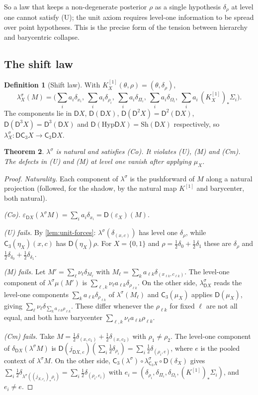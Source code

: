 \documentclass[11pt]{article}
\newtheorem{theorem}{Theorem}[section]
\theoremstyle{definition}
\newtheorem{definition}[theorem]{Definition}
\theoremstyle{remark}
\newcommand{\D}{\mathsf{D}}
\newcommand{\Hyp}{\mathrm{Hyp}}
\newcommand{\Sh}{\mathrm{Sh}}
\newcommand{\C}{\mathsf{C}}
\newcommand{\ls}{\lambda^{\sigma}}
\begin{document}
So a law that keeps a non-degenerate posterior $\rho$ as a single hypothesis $\delta_\rho$ at level one
cannot satisfy (U); the unit axiom requires level-one information to be spread over point
hypotheses. This is the precise form of the tension between hierarchy and barycentric collapse.

\subsection{The shift law}

\begin{definition}[Shift law]
With $K^{[1]}_X(\theta,\rho)=(\theta,\delta_\rho)$,
\[
\ls_X(M)=\Big(\sum_ia_i\delta_{x_i},\ \sum_ia_i\delta_{\rho_i},\ \sum_ia_i\delta_{\Pi_i},\
\sum_ia_i\delta_{\Omega_i},\ \sum_ia_i\,(K^{[1]}_X)_*\Sigma_i\Big).
\]
The components lie in $\D X$, $\D(\D X)$, $\D(\D^2X)=\D^2(\D X)$, $\D(\D^3X)=\D^3(\D X)$ and
$\D(\Hyp\D X)=\Sh(\D X)$ respectively, so $\ls_X\colon\D\C_3X\to\C_3\D X$.
\end{definition}

\begin{theorem}\label{thm:shift}
$\ls$ is natural and satisfies (Co). It violates (U), (M) and (Cm). The defects in (U) and (M) at
level one vanish after applying $\mu_X$.
\end{theorem}
\begin{proof}
\emph{Naturality.} Each component of $\ls$ is the pushforward of $M$ along a natural projection
(followed, for the shadow, by the natural map $K^{[1]}$ and barycenter, both natural).

\emph{(Co).} $\varepsilon_{\D X}(\ls M)=\sum_ia_i\delta_{x_i}=\D(\varepsilon_X)(M)$.

\emph{(U) fails.} By \cref{lem:unit-forces}: $\ls(\delta_{(x,c)})$ has level one $\delta_\rho$, while
$\C_3(\eta_X)(x,c)$ has $\D(\eta_X)\rho$. For $X=\{0,1\}$ and $\rho=\tfrac12\delta_0+\tfrac12\delta_1$
these are $\delta_\rho$ and $\tfrac12\delta_{\delta_0}+\tfrac12\delta_{\delta_1}$.

\emph{(M) fails.} Let $M'=\sum_\ell\nu_\ell\delta_{M_\ell}$ with $M_\ell=\sum_k a_{\ell k}
\delta_{(x_{\ell k},c_{\ell k})}$. The level-one component of $\ls\mu(M')$ is
$\sum_{\ell,k}\nu_\ell a_{\ell k}\delta_{\rho_{\ell k}}$. On the other side, $\ls_{\D X}$ reads the
level-one components $\sum_ka_{\ell k}\delta_{\rho_{\ell k}}$ of $\ls(M_\ell)$ and $\C_3(\mu_X)$ applies
$\D(\mu_X)$, giving $\sum_\ell\nu_\ell\delta_{\sum_ka_{\ell k}\rho_{\ell k}}$. These differ whenever the
$\rho_{\ell k}$ for fixed $\ell$ are not all equal, and both have barycenter
$\sum_{\ell,k}\nu_\ell a_{\ell k}\rho_{\ell k}$.

\emph{(Cm) fails.} Take $M=\tfrac12\delta_{(x,c_1)}+\tfrac12\delta_{(x,c_2)}$ with $\rho_1\neq\rho_2$.
The level-one component of $\delta_{\D X}(\ls M)$ is $\D(j_{\D X,e})(\sum_i\tfrac12\delta_{\rho_i})
=\sum_i\tfrac12\delta_{(\rho_i,e)}$, where $e$ is the pooled context of $\ls M$. On the other side,
$\C_3(\ls)\circ\ls_{\C_3X}\circ\D(\delta_X)$ gives $\sum_i\tfrac12\delta_{\ls((j_{X,c_i})_*\rho_i)}
=\sum_i\tfrac12\delta_{(\rho_i,e_i)}$ with $e_i=(\delta_{\rho_i},\delta_{\Pi_i},\delta_{\Omega_i},
(K^{[1]})_*\Sigma_i)$, and $e_i\ne e$.
\end{proof}
\end{document}
